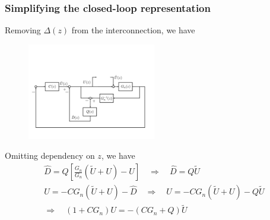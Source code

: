 \begin{frame}
    \frametitle{Simplifying the closed-loop representation}

    Removing $\Delta(z)$ from the interconnection, we have
    \begin{figure}
        \includegraphics[width=0.5\textwidth]{Disturbance_Observer_multi4}
    \end{figure}
    \pause
    Omitting dependency on $z$, we have
    \begin{gather*}
        \hat{D} = Q \left[ \frac{G_n}{G_n}(\tilde{U} + U) - U \right]
            \quad \Rightarrow \quad \hat{D} = Q \tilde{U} \\
        U = -CG_n (\tilde{U} + U) - \hat{D}
            \quad \Rightarrow \quad U = -CG_n(\tilde{U} + U) - Q \tilde{U} \\
        \Rightarrow \quad (1 + CG_n) U = -(CG_n + Q) \tilde{U}
    \end{gather*}

\end{frame}

